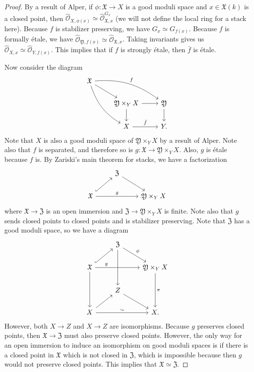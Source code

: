 \documentclass{amsart}
\theoremstyle{definition}
\theoremstyle{remark}
\theoremstyle{plain}
\theoremstyle{definition}
\theoremstyle{remark}
\newcommand{\mc}[1]{\mathcal{#1}}
\newcommand{\mf}[1]{\mathfrak{#1}}
\newcommand{\1}{\mathbf{1}}
\newcommand{\2}{\mathbf{2}}
\newcommand{\3}{\mathbf{3}}
\begin{document}
\begin{proof}
    By a result of Alper, if \(\phi \colon \mf{X} \to X\) is a good moduli space and \(x \in \mf{X}(k)\) is a closed point, then \(\hat{\mc{O}}_{X, \phi(x)} \simeq \hat{\mc{O}}_{\mf{X}, x}^{G_x}\) (we will not define the local ring for a stack here). Because \(f\) is stabilizer preserving, we have \(G_x \simeq G_{f(x)}\). Because \(f\) is formally \'etale, we have \(\hat{\mc{O}}_{\mf{Y}, f(x)} \simeq \hat{\mc{O}}_{\mf{X}, x}\). Taking invariants gives us \(\hat{\mc{O}}_{X, x} \simeq \hat{\mc{O}}_{Y, f(x)}\). This implies that if \(f\) is strongly \'etale, then \(\bar{f}\) is \'etale.

    Now consider the diagram
    \begin{equation*}
    \begin{tikzcd}
        \mf{X} \ar[bend right=20]{ddr} \ar[bend left=20]{drr}{f} \ar{dr} \\
        & \mf{Y} \times_Y X \ar{r} \ar{d} & \mf{Y} \ar{d} \\
        & X \ar{r}{\bar{f}} & Y.
    \end{tikzcd}
    \end{equation*}
    Note that \(X\) is also a good moduli space of \(\mf{Y} \times_Y X\) by a result of Alper. Note also that \(f\) is separated, and therefore so is \(g \colon \mf{X} \to \mf{Y} \times_Y X\). Also, \(g\) is \'etale because \(f\) is. By Zariski's main theorem for stacks, we have a factorization
    \begin{equation*}
    \begin{tikzcd}
        & \mf{Z} \ar{dr} \\
        \mf{X} \ar[hookrightarrow]{ur} \ar{rr}{g} & & \mf{Y} \times_Y X
    \end{tikzcd}
    \end{equation*}
    where \(\mf{X} \to \mf{Z}\) is an open immersion and \(\mf{Z} \to \mf{Y} \times_Y X\) is finite. Note also that \(g\) sends closed points to closed points and is stabilizer preserving. Note that \(\mf{Z}\) has a good moduli space, so we have a diagram
    \begin{equation*}
    \begin{tikzcd}
        & \mf{Z} \ar{dr}{\phi} \ar{dd} \\
        \mf{X} \ar[hookrightarrow]{ur} \ar[rr,"g",near start] \ar{dd} & & \mf{Y} \times_Y X \ar{dd}{\pi} \\
        & Z \ar{dr} \\
        X \ar{ur} \ar{rr}{\sim} & & X.
    \end{tikzcd}
    \end{equation*}
    However, both \(X \to Z\) and \(X \to Z\) are isomorphisms. Because \(g\) preserves closed points, then \(\mf{X} \to \mf{Z}\) must also preserve closed points. However, the only way for an open immersion to induce an isomorphism on good moduli spaces is if there is a closed point in \(\mf{X}\) which is not closed in \(\mf{Z}\), which is impossible because then \(g\) would not preserve closed points. This implies that \(\mf{X} \simeq \mf{Z}\).


\end{proof}
\end{document}
